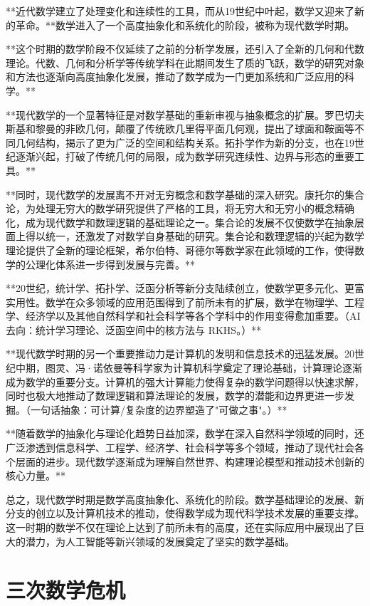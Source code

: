 **近代数学建立了处理变化和连续性的工具，而从19世纪中叶起，数学又迎来了新的革命。**数学进入了一个高度抽象化和系统化的阶段，被称为现代数学时期。

**这个时期的数学阶段不仅延续了之前的分析学发展，还引入了全新的几何和代数理论。代数、几何和分析学等传统学科在此期间发生了质的飞跃，数学的研究对象和方法也逐渐向高度抽象化发展，推动了数学成为一门更加系统和广泛应用的科学。**

**现代数学的一个显著特征是对数学基础的重新审视与抽象概念的扩展。罗巴切夫斯基和黎曼的非欧几何，颠覆了传统欧几里得平面几何观，提出了球面和鞍面等不同几何结构，揭示了更为广泛的空间和结构关系。拓扑学作为新的分支，也在19世纪逐渐兴起，打破了传统几何的局限，成为数学研究连续性、边界与形态的重要工具。**

**同时，现代数学的发展离不开对无穷概念和数学基础的深入研究。康托尔的集合论，为处理无穷大的数学研究提供了严格的工具，将无穷大和无穷小的概念精确化，成为现代数学和数理逻辑的基础理论之一。集合论的发展不仅使数学在抽象层面上得以统一，还激发了对数学自身基础的研究。集合论和数理逻辑的兴起为数学理论提供了全新的理论框架，希尔伯特、哥德尔等数学家在此领域的工作，使得数学的公理化体系进一步得到发展与完善。**

**20世纪，统计学、拓扑学、泛函分析等新分支陆续创立，使数学更多元化、更富实用性。数学在众多领域的应用范围得到了前所未有的扩展，数学在物理学、工程学、经济学以及其他自然科学和社会科学等各个学科中的作用变得愈加重要。{（AI 去向：统计学习理论、泛函空间中的核方法与 RKHS。）}**

**现代数学时期的另一个重要推动力是计算机的发明和信息技术的迅猛发展。20世纪中期，图灵、冯·诺依曼等科学家为计算机科学奠定了理论基础，计算理论逐渐成为数学的重要分支。计算机的强大计算能力使得复杂的数学问题得以快速求解，同时也极大地推动了数理逻辑和算法理论的发展，数学的潜能和边界更进一步发掘。{（一句话抽象：可计算/复杂度的边界塑造了"可做之事"。）}**

**随着数学的抽象化与理论化趋势日益加深，数学在深入自然科学领域的同时，还广泛渗透到信息科学、工程学、经济学、社会科学等多个领域，推动了现代社会各个层面的进步。现代数学逐渐成为理解自然世界、构建理论模型和推动技术创新的核心力量。**

总之，现代数学时期是数学高度抽象化、系统化的阶段。数学基础理论的发展、新分支的创立以及计算机技术的推动，使得数学成为现代科学技术发展的重要支撑。这一时期的数学不仅在理论上达到了前所未有的高度，还在实际应用中展现出了巨大的潜力，为人工智能等新兴领域的发展奠定了坚实的数学基础。

\section{三次数学危机}

